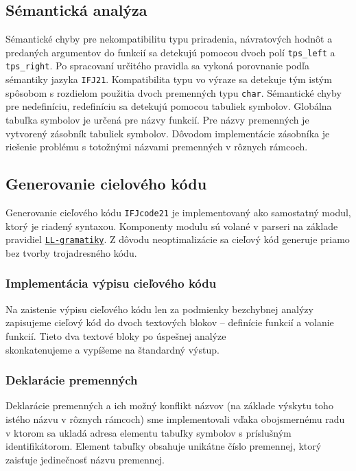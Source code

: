 \documentclass[a4paper, 11pt]{article}
\begin{document}
    \subsection{Sémantická analýza}

        Sémantické chyby pre nekompatibilitu typu priradenia, návratových hodnôt a predaných
        argumentov do funkcií sa detekujú pomocou dvoch polí \texttt{tps\_left} a \texttt{tps\_right}. Po spracovaní
        určitého pravidla sa vykoná porovnanie podľa sémantiky jazyka \texttt{IFJ21}.
        Kompatibilita typu vo výraze sa detekuje tým istým spôsobom s rozdielom použitia dvoch premenných typu \texttt{char}.
        Sémantické chyby pre nedefiníciu, redefiníciu sa detekujú pomocou tabuliek symbolov. Globálna tabuľka
        symbolov je určená pre názvy funkcií. Pre názvy premenných je vytvorený zásobník
        tabuliek symbolov. Dôvodom implementácie zásobníka je riešenie problému s totožnými názvami premenných v
        rôznych rámcoch.



    \subsection{Generovanie cielového kódu}
    Generovanie cieľového kódu \texttt{IFJcode21} je implementovaný ako samostatný modul, ktorý je riadený syntaxou.
    Komponenty modulu sú volané v parseri na základe pravidiel \hyperref[sec: LL-gramatika]{\texttt{LL-gramatiky}}. Z dôvodu neoptimalizácie sa cieľový kód
    generuje priamo bez tvorby trojadresného kódu.

    \subsubsection{Implementácia výpisu cieľového kódu}
    Na zaistenie výpisu cieľového kódu len za podmienky bezchybnej analýzy zapisujeme cieľový kód do dvoch textových
    blokov -- definície funkcií a volanie funkcií. Tieto dva textové bloky po úspešnej analýze\\ skonkatenujeme a
    vypíšeme na štandardný výstup.

    \subsubsection{Deklarácie premenných}
    Deklarácie premenných a ich možný konflikt názvov (na základe výskytu toho istého názvu v rôznych rámcoch)
    sme implementovali vďaka obojsmernému radu v ktorom sa ukladá adresa elementu tabuľky
    symbolov s príslušným identifikátorom. Element tabuľky obsahuje unikátne číslo premennej, ktorý zaisťuje jedinečnosť
    názvu premennej.
\end{document}
